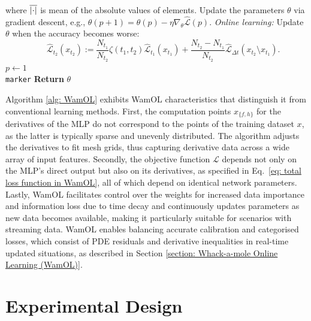 \documentclass[sigconf, authorversion=true, nonacm=true]{acmart}
\begin{document}
\begin{algorithm}
\begin{algorithmic}
        \State where $\overline{\abs{\cdot}}$ is mean of the absolute values of elements.    
    \EndIf
    \State Update the parameters $\theta$ via gradient descent, e.g.,
    \State \hspace{15pt}$\theta(p+1)=\theta(p)-\eta \nabla_{\theta} \widehat{\mathcal{L}}\left(p\right)$.
\EndFor
\State \textit{Online learning:} Update $\theta$ when the accuracy becomes worse:
    {\small $$\;\;\;\;\;\;\widehat{\mathcal{L}}_{t_2}\left(x_{t_2}\right) := \frac{N_{t_1}}{N_{t_2}}\zeta\left(t_1, t_2\right) \widehat{\mathcal{L}}_{t_1}\left(x_{t_1}\right) + \frac{N_{t_2} - N_{t_1}}{N_{t_2}} \widehat{\mathcal{L}}_{\Delta t}\left(x_{t_2} \setminus x_{t_1}\right).$$}
    \State $p \leftarrow 1$ \\
    \;\;\;\; \Goto \texttt{marker}
\EndIf
\State \textbf{Return} $\theta$
\end{algorithmic}
\end{algorithm}

Algorithm \ref{alg: WamOL} exhibits WamOL characteristics that distinguish it from conventional learning methods. First, the computation points $x_{\{f,h\}}$ for the derivatives of the MLP do not correspond to the points of the training dataset $x$, as the latter is typically sparse and unevenly distributed. The algorithm adjusts the derivatives to fit mesh grids, thus capturing derivative data across a wide array of input features. Secondly, the objective function $\mathcal{L}$ depends not only on the MLP's direct output but also on its derivatives, as specified in Eq.~\eqref{eq: total loss function in WamOL}, all of which depend on identical network parameters. Lastly, WamOL facilitates control over the weights for increased data importance and information loss due to time decay and continuously updates parameters as new data becomes available, making it particularly suitable for scenarios with streaming data. WamOL enables balancing accurate calibration and categorised losses, which consist of PDE residuals and derivative inequalities in real-time updated situations, as described in Section \ref{section: Whack-a-mole Online Learning (WamOL)}.


\section{Experimental Design}
\label{section: Experimental Design}
\end{document}
